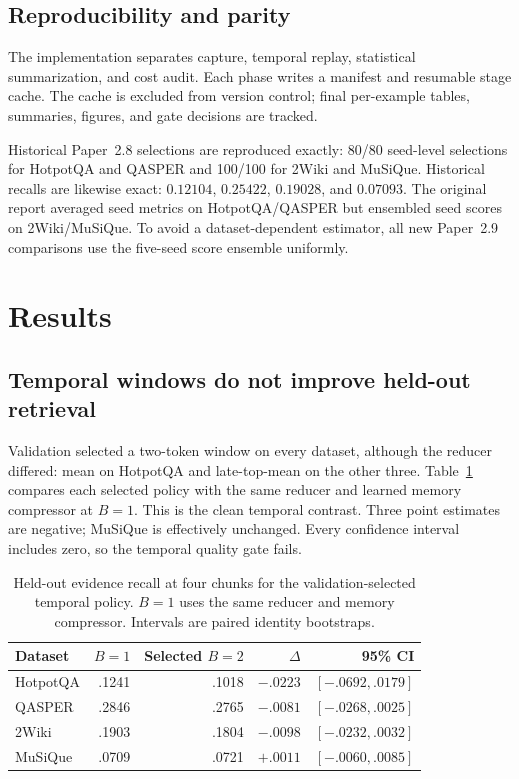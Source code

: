 \documentclass[11pt]{article}
\begin{document}
\subsection{Reproducibility and parity}
The implementation separates capture, temporal replay, statistical summarization, and cost audit. Each phase writes a manifest and resumable stage cache. The cache is excluded from version control; final per-example tables, summaries, figures, and gate decisions are tracked.

Historical Paper~2.8 selections are reproduced exactly: 80/80 seed-level selections for HotpotQA and QASPER and 100/100 for 2Wiki and MuSiQue. Historical recalls are likewise exact: $0.12104$, $0.25422$, $0.19028$, and $0.07093$. The original report averaged seed metrics on HotpotQA/QASPER but ensembled seed scores on 2Wiki/MuSiQue. To avoid a dataset-dependent estimator, all new Paper~2.9 comparisons use the five-seed score ensemble uniformly.

\section{Results}
\subsection{Temporal windows do not improve held-out retrieval}
Validation selected a two-token window on every dataset, although the reducer differed: mean on HotpotQA and late-top-mean on the other three. Table~\ref{tab:main} compares each selected policy with the same reducer and learned memory compressor at $B=1$. This is the clean temporal contrast. Three point estimates are negative; MuSiQue is effectively unchanged. Every confidence interval includes zero, so the temporal quality gate fails.

\begin{table}[t]
\centering
\caption{Held-out evidence recall at four chunks for the validation-selected temporal policy. $B=1$ uses the same reducer and memory compressor. Intervals are paired identity bootstraps.}
\label{tab:main}
\small
\begin{tabular}{lrrrr}
\toprule
Dataset & $B=1$ & Selected $B=2$ & $\Delta$ & 95\% CI \\
\midrule
HotpotQA & .1241 & .1018 & $-.0223$ & $[-.0692,.0179]$ \\
QASPER & .2846 & .2765 & $-.0081$ & $[-.0268,.0025]$ \\
2Wiki & .1903 & .1804 & $-.0098$ & $[-.0232,.0032]$ \\
MuSiQue & .0709 & .0721 & $+.0011$ & $[-.0060,.0085]$ \\
\bottomrule
\end{tabular}
\end{table}
\end{document}
